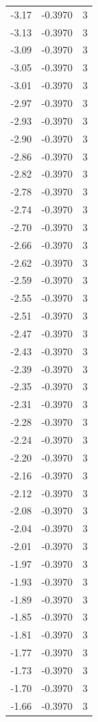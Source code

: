 \begin{longtable}{lrr}
  -3.17 & -0.3970 & 3 \\
  -3.13 & -0.3970 & 3 \\
  -3.09 & -0.3970 & 3 \\
  -3.05 & -0.3970 & 3 \\
  -3.01 & -0.3970 & 3 \\
  -2.97 & -0.3970 & 3 \\
  -2.93 & -0.3970 & 3 \\
  -2.90 & -0.3970 & 3 \\
  -2.86 & -0.3970 & 3 \\
  -2.82 & -0.3970 & 3 \\
  -2.78 & -0.3970 & 3 \\
  -2.74 & -0.3970 & 3 \\
  -2.70 & -0.3970 & 3 \\
  -2.66 & -0.3970 & 3 \\
  -2.62 & -0.3970 & 3 \\
  -2.59 & -0.3970 & 3 \\
  -2.55 & -0.3970 & 3 \\
  -2.51 & -0.3970 & 3 \\
  -2.47 & -0.3970 & 3 \\
  -2.43 & -0.3970 & 3 \\
  -2.39 & -0.3970 & 3 \\
  -2.35 & -0.3970 & 3 \\
  -2.31 & -0.3970 & 3 \\
  -2.28 & -0.3970 & 3 \\
  -2.24 & -0.3970 & 3 \\
  -2.20 & -0.3970 & 3 \\
  -2.16 & -0.3970 & 3 \\
  -2.12 & -0.3970 & 3 \\
  -2.08 & -0.3970 & 3 \\
  -2.04 & -0.3970 & 3 \\
  -2.01 & -0.3970 & 3 \\
  -1.97 & -0.3970 & 3 \\
  -1.93 & -0.3970 & 3 \\
  -1.89 & -0.3970 & 3 \\
  -1.85 & -0.3970 & 3 \\
  -1.81 & -0.3970 & 3 \\
  -1.77 & -0.3970 & 3 \\
  -1.73 & -0.3970 & 3 \\
  -1.70 & -0.3970 & 3 \\
  -1.66 & -0.3970 & 3 \\

\end{longtable}
